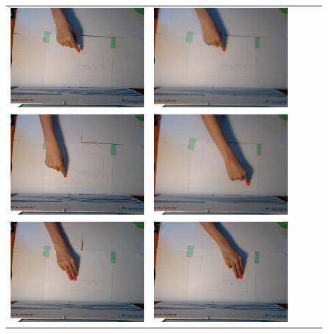 \begin{tabular}{lllll}
\includegraphics[width=5cm]{fig3/im1_13.png} &
\includegraphics[width=5cm]{fig3/im1_55.png} \\
\includegraphics[width=5cm]{fig3/im1_67.png} &
\includegraphics[width=5cm]{fig3/im1_146.png} \\
\includegraphics[width=5cm]{fig3/im2_26.png} &
\includegraphics[width=5cm]{fig3/im2_98.png} \\

\end{tabular}
